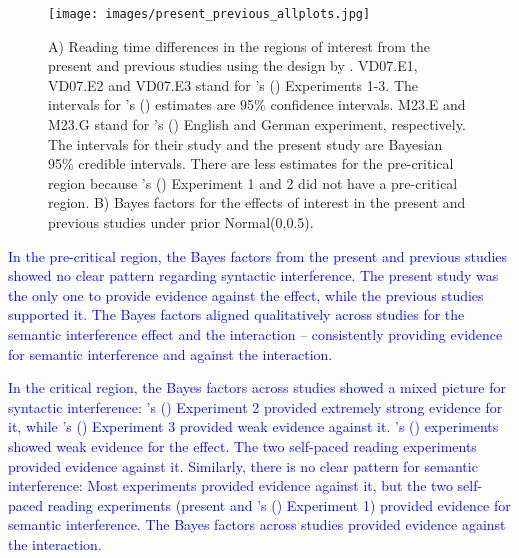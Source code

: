\documentclass[a4paper, man, floatsintext]{apa7}
\begin{document}
{{\begin{figure}
    \caption{A) Reading time differences in the regions of interest from the present and previous studies using the design by \textcite{vandyke07}. VD07.E1, VD07.E2 and VD07.E3 stand for \citeauthor{vandyke07}'s (\citeyear{vandyke07}) Experiments 1-3. The intervals for \citeauthor{vandyke07}'s (\citeyear{vandyke07}) estimates are 95\% confidence intervals. M23.E and M23.G stand for \citeauthor{mertzen}'s (\citeyear{mertzen}) English and German experiment, respectively. The intervals for their study and the present study are Bayesian 95\% credible intervals. There are less estimates for the pre-critical region because \citeauthor{vandyke07}'s (\citeyear{vandyke07}) Experiment 1 and 2 did not have a pre-critical region. B) Bayes factors for the effects of interest in the present and previous studies under prior Normal(0,0.5).}
    \label{fig:previous_vs_present}
    \centering
    \texttt{[image: images/present\_previous\_allplots.jpg]}
\end{figure}
\clearpage

\textcolor{blue}{In the pre-critical region, the Bayes factors from the present and previous studies showed no clear pattern regarding syntactic interference. The present study was the only one to provide evidence against the effect, while the previous studies supported it. The Bayes factors aligned qualitatively across studies for the semantic interference effect and the interaction -- consistently providing evidence for semantic interference and against the interaction.}

\textcolor{blue}{In the critical region, the Bayes factors across studies showed a mixed picture for syntactic interference: \citeauthor{vandyke07}'s (\citeyear{vandyke07}) Experiment 2 provided extremely strong evidence for it, while \citeauthor{vandyke07}'s (\citeyear{vandyke07}) Experiment 3 provided weak evidence against it. \citeauthor{mertzen}'s (\citeyear{mertzen}) experiments showed weak evidence for the effect. The two self-paced reading experiments provided evidence against it. Similarly, there is no clear pattern for semantic interference: Most experiments provided evidence against it, but the two self-paced reading experiments (present and \citeauthor{vandyke07}'s (\citeyear{vandyke07}) Experiment 1) provided evidence for semantic interference. The Bayes factors across studies provided evidence against the interaction.}

}}
\end{document}

